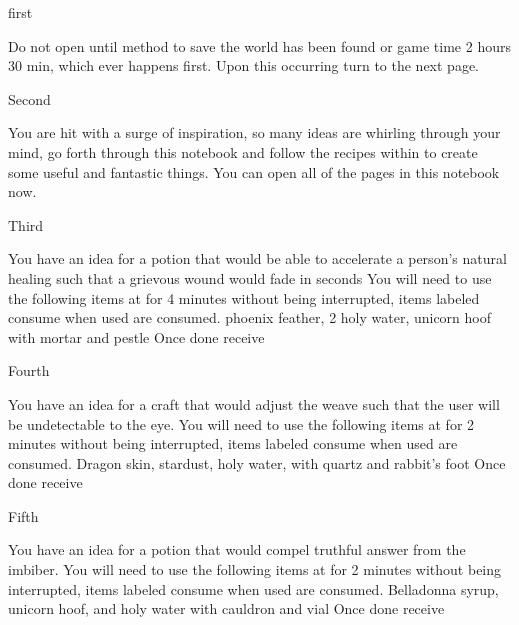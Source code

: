 \documentclass[greennotebook]{guildcamp3} %
\begin{document}
\startnotebook{\nMagOneRecipes{}}

\begin{page}{first}
	
	Do not open until method to save the world has been found or game time 2 hours 30 min, which ever happens first. Upon this occurring turn to the next page.
	
\end{page}

\begin{page}{Second}
	
	You are hit with a surge of inspiration, so many ideas are whirling through your mind, go forth through this notebook and follow the recipes within to create some useful and fantastic things. You can open all of the pages in this notebook now.
	
\end{page}

\begin{page}{Third}
	
	You have an idea for a potion that would be able to accelerate a person's natural healing such that a grievous wound would fade in seconds
	You will need to use the following items at \sMageWorkbench{} for 4 minutes without being interrupted, items labeled consume when used are consumed.
	phoenix feather, 2 holy water, unicorn hoof with mortar and pestle
	Once done receive \iHealthRemedy{}
	
\end{page}

\begin{page}{Fourth}
	
	You have an idea for a craft that would adjust the weave such that the user will be undetectable to the eye.
	You will need to use the following items at\sMageWorkbench{} for 2 minutes without being interrupted, items labeled consume when used are consumed.
	Dragon skin, stardust, holy water, with quartz and rabbit's foot
	Once done receive \iInvisibilityCloak{}
	
\end{page}

\begin{page}{Fifth}
	
	You have an idea for a potion that would compel truthful answer from the imbiber.
	You will need to use the following items at \sMageWorkbench{} for 2 minutes without being interrupted, items labeled consume when used are consumed.
	Belladonna syrup, unicorn hoof, and holy water with cauldron and vial
	Once done receive \iTruthPotion{}
	
\end{page}
\end{document}
